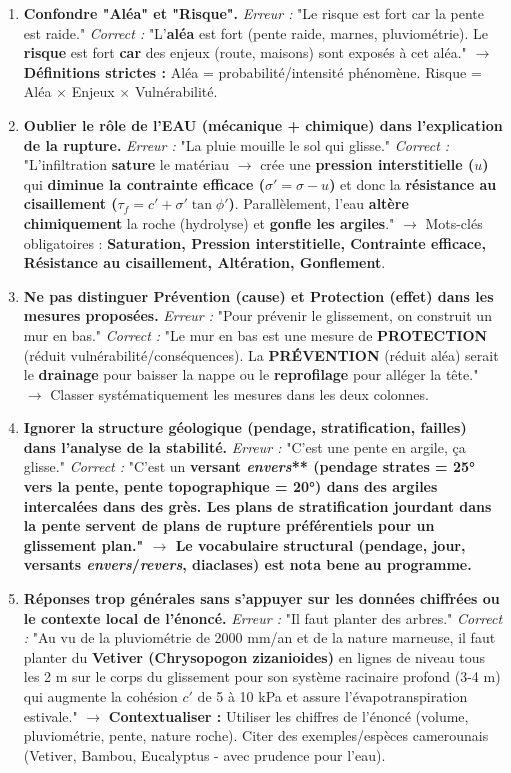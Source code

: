\documentclass[11pt]{article}
\begin{document}
\begin{attention}
    \begin{enumerate}
        \item \textbf{Confondre "Aléa" et "Risque".} \textit{Erreur :} "Le risque est fort car la pente est raide." \textit{Correct :} "L'\textbf{aléa} est fort (pente raide, marnes, pluviométrie). Le \textbf{risque} est fort \textbf{car} des enjeux (route, maisons) sont exposés à cet aléa." $\rightarrow$ \textbf{Définitions strictes :} Aléa = probabilité/intensité phénomène. Risque = Aléa $\times$ Enjeux $\times$ Vulnérabilité.
        \item \textbf{Oublier le rôle de l'EAU (mécanique + chimique) dans l'explication de la rupture.} \textit{Erreur :} "La pluie mouille le sol qui glisse." \textit{Correct :} "L'infiltration \textbf{sature} le matériau $\rightarrow$ crée une \textbf{pression interstitielle ($u$)} qui \textbf{diminue la contrainte efficace ($\sigma' = \sigma - u$)} et donc la \textbf{résistance au cisaillement ($\tau_f = c' + \sigma' \tan \phi'$)}. Parallèlement, l'eau \textbf{altère chimiquement} la roche (hydrolyse) et \textbf{gonfle les argiles}." $\rightarrow$ Mots-clés obligatoires : \textbf{Saturation, Pression interstitielle, Contrainte efficace, Résistance au cisaillement, Altération, Gonflement}.
        \item \textbf{Ne pas distinguer Prévention (cause) et Protection (effet) dans les mesures proposées.} \textit{Erreur :} "Pour prévenir le glissement, on construit un mur en bas." \textit{Correct :} "Le mur en bas est une mesure de \textbf{PROTECTION} (réduit vulnérabilité/conséquences). La \textbf{PRÉVENTION} (réduit aléa) serait le \textbf{drainage} pour baisser la nappe ou le \textbf{reprofilage} pour alléger la tête." $\rightarrow$ Classer systématiquement les mesures dans les deux colonnes.
        \item \textbf{Ignorer la structure géologique (pendage, stratification, failles) dans l'analyse de la stabilité.} \textit{Erreur :} "C'est une pente en argile, ça glisse." \textit{Correct :} "C'est un \textbf{versant \emph{envers}** (pendage strates = 25° vers la pente, pente topographique = 20°) dans des \textbf{argiles intercalées dans des grès}. Les plans de stratification jourdant dans la pente servent de \textbf{plans de rupture préférentiels} pour un \textbf{glissement plan}." $\rightarrow$ Le vocabulaire structural (pendage, jour, versants \emph{envers}/\emph{revers}, diaclases) est nota bene au programme.}
        \item \textbf{Réponses trop générales sans s'appuyer sur les données chiffrées ou le contexte local de l'énoncé.} \textit{Erreur :} "Il faut planter des arbres." \textit{Correct :} "Au vu de la pluviométrie de 2000 mm/an et de la nature marneuse, il faut planter du \textbf{Vetiver (Chrysopogon zizanioides)} en lignes de niveau tous les 2 m sur le corps du glissement pour son système racinaire profond (3-4 m) qui augmente la cohésion $c'$ de 5 à 10 kPa et assure l'évapotranspiration estivale." $\rightarrow$ \textbf{Contextualiser :} Utiliser les chiffres de l'énoncé (volume, pluviométrie, pente, nature roche). Citer des exemples/espèces camerounais (Vetiver, Bambou, Eucalyptus - avec prudence pour l'eau).

\end{enumerate}
\end{attention}
\end{document}
